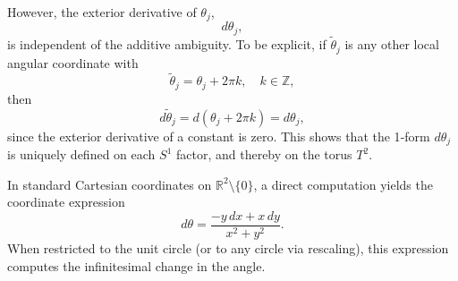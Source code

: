 \documentclass[11pt,openany]{article}
\begin{document}
However, the exterior derivative of \(\theta_j\),
\[
d\theta_j,
\]
is independent of the additive ambiguity. To be explicit, if \(\widetilde{\theta}_j\) is any other local angular coordinate with
\[
\widetilde{\theta}_j = \theta_j + 2\pi k,\quad k\in\mathbb{Z},
\]
then
\[
d\widetilde{\theta}_j = d(\theta_j + 2\pi k) = d\theta_j,
\]
since the exterior derivative of a constant is zero. This shows that the 1‑form \(d\theta_j\) is uniquely defined on each \(S^1\) factor, and thereby on the torus \(T^2\).

In standard Cartesian coordinates on \(\mathbb{R}^2\setminus\{0\}\), a direct computation yields the coordinate expression
\[
d\theta = \frac{-y\,dx+x\,dy}{x^2+y^2}.
\]
When restricted to the unit circle (or to any circle via rescaling), this expression computes the infinitesimal change in the angle.
\end{document}
